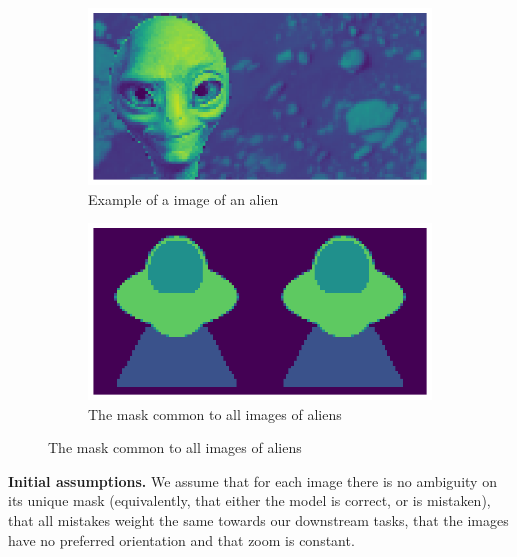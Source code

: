\documentclass[11pt]{template}
\begin{document}
\begin{multicols}{2}
\begin{figure}[H]
        \begin{subfigure}{\linewidth}
            \centering
            \includegraphics[width=0.75\linewidth]{assets/alien_image.png}
            \caption{Example of a image of an alien}
            \label{fig:filters1}
        \end{subfigure}
        \begin{subfigure}{\linewidth}
            \centering
            \includegraphics[width=0.75\linewidth]{assets/alien_label.png}
            \caption{The mask common to all images of aliens}
            \label{fig:filters2}
        \end{subfigure}
\end{figure}

\textbf{Initial assumptions.}
We assume that for each image there is no ambiguity on its unique mask (equivalently, that either the model is correct, or is mistaken), that all mistakes weight the same towards our downstream tasks, that the images have no preferred orientation and that zoom is constant.
                

\end{multicols}
\end{document}
